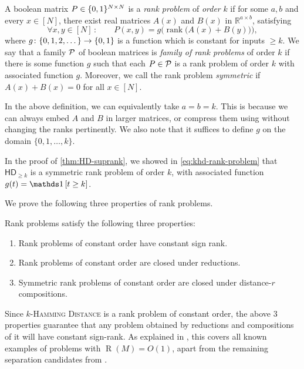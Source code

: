 \documentclass{article}
\DeclareMathOperator{\Rand}{R}
\DeclareMathOperator{\rank}{rank}
\newcommand{\HD}[1]{\mathsf{HD}_{#1}}
\newcommand{\R}{\mathbb{R}}
\begin{document}
\begin{boxdefinition} \label{def:rank-problem}
A boolean matrix $P \in \{0,1\}^{N \times N}$ is a \emph{rank problem} of
\emph{order} $k$ if for some $a,b$ and every $x \in [N]$, there exist real matrices $A(x)$ and $B(x)$ in $\R^{a\times b}$, satisfying
\[
	\forall x,y\in[N]\,\colon\qquad P(x,y) = g\Big(\rank\!\big(A(x) + B(y)\big)\Big),
\]
where $g \colon \{0,1,2,\dots\} \to
\{0,1\}$ is a function which is constant for inputs $\geq k$. 
We say that a family $\mathcal{P}$ of boolean matrices is \emph{family of rank problems} of
order $k$ if there is some function $g$ such that
each $P \in \mathcal{P}$ is a rank problem of order $k$ with associated function $g$. Moreover, we call the rank problem \emph{symmetric} if $A(x) + B(x) = 0$ for all $x \in [N]$.
\end{boxdefinition}

\begin{remark}\label{rem:rank-domain}
	In the above definition, we can equivalently take $a = b = k$. This is because we can always embed $A$ and $B$ in larger matrices, or compress them using  without changing the ranks pertinently. We also note that it suffices to define $g$ on the domain $\{0,1,\dots, k\}$.
\end{remark}

\begin{example}\label{ex:HD-rank-problem}
In the proof of \cref{thm:HD-suprank}, we showed in \cref{eq:khd-rank-problem} that
$\HD{\geq k}$ is a symmetric rank problem of order $k$, with associated function $g(t) =
\ind{t \geq k}$.
\end{example}

We prove the following three properties of rank problems.

\begin{boxtheorem}\label{thm:rank-problem-main}
	Rank problems satisfy the following three properties:
	\begin{enumerate}
		\item Rank problems of constant order have constant sign rank.
		\item Rank problems of constant order are closed under reductions.
		\item Symmetric rank problems of constant order are closed under distance-$r$ compositions.
	\end{enumerate}
\end{boxtheorem}

Since \textsc{$k$-Hamming Distance} is a rank problem of constant order, the
above 3 properties guarantee that any problem obtained by reductions and
compositions of it will have constant sign-rank. As explained in \cite{FGHH25},
this covers all known examples of problems with $\Rand(M) = O(1)$, apart from the remaining separation candidates from \cite{SS24}.
\end{document}
